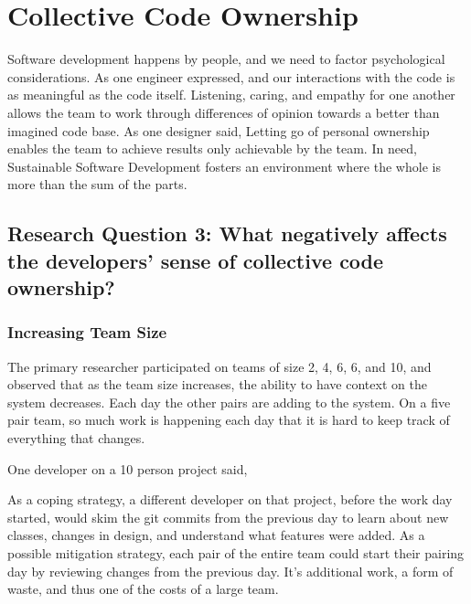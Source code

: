 \section{Collective Code Ownership}
\label{CollectiveCodeOwnership}

Software development happens by people, and we need to factor psychological considerations. As one engineer expressed,  and our interactions with the code is as meaningful as the code itself. Listening, caring, and empathy for one another allows the team to work through differences of opinion towards a better than imagined code base. As one designer said,  Letting go of personal ownership enables the team to achieve results only achievable by the team. In need, Sustainable Software Development fosters an environment where the whole is more than the sum of the parts. 
\subsection{Research Question 3: What negatively affects the developers' sense of collective code ownership?}
\subsubsection{Increasing Team Size}

The primary researcher participated on teams of size 2, 4, 6, 6, and 10, and observed that as the team size increases, the ability to have context on the system decreases. Each day the other pairs are adding to the system. On a five pair team, so much work is happening each day that it is hard to keep track of everything that changes.

One developer on a 10 person project said, 

As a coping strategy, a different developer on that project, before the work day started, would skim the git commits from the previous day to learn about new classes, changes in design, and understand what features were added. As a possible mitigation strategy, each pair of the entire team could start their pairing day by reviewing changes from the previous day. It's additional work, a form of waste, and thus one of the costs of a large team. 


